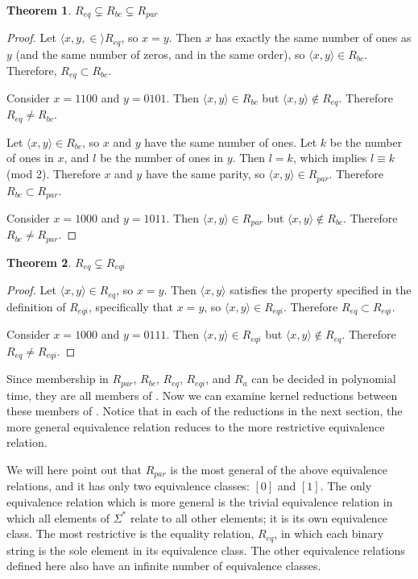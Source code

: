\documentclass{article}
\newtheorem{theorem}{Theorem}[section]
\theoremstyle{definition} \newtheorem{definition}[definition]{Definition}
\newcommand{\sigmastar}{\Sigma^{*}} %
\newcommand{\pair}[2]{\langle#1,#2\rangle} %
\begin{document}
\begin{theorem}$R_{eq} \subsetneq R_{bc} \subsetneq R_{par}$\end{theorem}
\begin{proof}
  Let $\pair{x, y}\in R_{eq}$, so $x=y$. Then $x$ has exactly the same number
  of ones as $y$ (and the same number of zeros, and in the same order), so
  $\pair{x}{y}\in R_{bc}$. Therefore, $R_{eq} \subset R_{bc}$.
 
  Consider $x=1100$ and $y=0101$. Then $\pair{x}{y}\in R_{bc}$ but $\pair{x}{y}
  \notin R_{eq}$. Therefore $R_{eq} \neq R_{bc}$.

  Let $\pair{x}{y}\in R_{bc}$, so $x$ and $y$ have the same number of ones. Let
  $k$ be the number of ones in $x$, and $l$ be the number of ones in $y$. Then
  $l=k$, which implies $l \equiv k$ (mod 2). Therefore $x$ and $y$ have the
  same parity, so $\pair{x}{y}\in R_{par}$. Therefore $R_{bc} \subset R_{par}$.

  Consider $x=1000$ and $y=1011$. Then $\pair{x}{y}\in R_{par}$ but
  $\pair{x}{y} \notin R_{bc}$. Therefore $R_{bc} \neq R_{par}$.
\end{proof}

\begin{theorem}$R_{eq} \subsetneq R_{eqi}$\end{theorem}
\begin{proof}
  Let $\pair{x}{y}\in R_{eq}$, so $x=y$. Then $\pair{x}{y}$ satisfies the
  property specified in the definition of $R_{eqi}$, specifically that $x=y$,
  so $\pair{x}{y} \in R_{eqi}$. Therefore $R_{eq} \subset R_{eqi}$.

  Consider $x=1000$ and $y=0111$. Then $\pair{x}{y}\in R_{eqi}$ but
  $\pair{x}{y} \notin R_{eq}$. Therefore $R_{eq} \neq R_{eqi}$.
\end{proof}

Since membership in $R_{par}$, $R_{bc}$, $R_{eq}$, $R_{eqi}$, and $R_a$ can be
decided in polynomial time, they are all members of \PEq. Now we can examine
kernel reductions between these members of \PEq. Notice that in each of the
reductions in the next section, the more general equivalence relation reduces
to the more restrictive equivalence relation.

We will here point out that $R_{par}$ is the most general of the above
equivalence relations, and it has only two equivalence classes: $[0]$ and
$[1]$. The only equivalence relation which is more general is the trivial
equivalence relation in which all elements of $\sigmastar$ relate to all other
elements; it is its own equivalence class. The most restrictive is the equality
relation, $R_{eq}$, in which each binary string is the sole element in its
equivalence class. The other equivalence relations defined here also have an
infinite number of equivalence classes.
\end{document}
